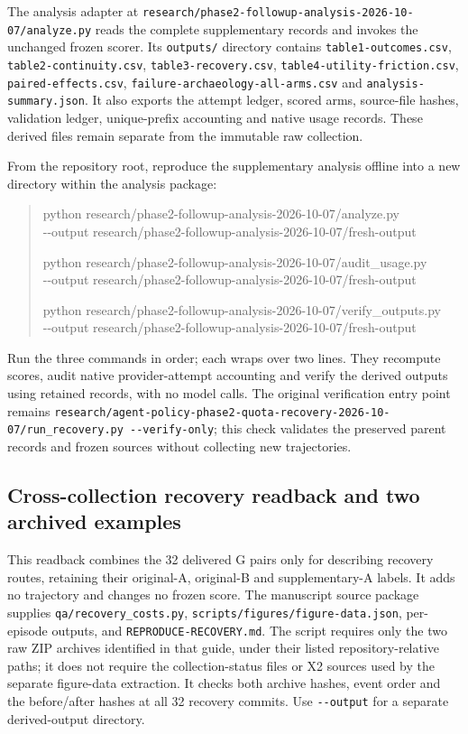 \documentclass[11pt,a4paper]{article}
\newcommand{\code}[1]{\nolinkurl{#1}}
\begin{document}
The analysis adapter at \code{research/phase2-followup-analysis-2026-10-07/analyze.py} reads the complete supplementary records and invokes the unchanged frozen scorer. Its \code{outputs/} directory contains \code{table1-outcomes.csv}, \code{table2-continuity.csv}, \code{table3-recovery.csv}, \code{table4-utility-friction.csv}, \code{paired-effects.csv}, \code{failure-archaeology-all-arms.csv} and \code{analysis-summary.json}. It also exports the attempt ledger, scored arms, source-file hashes, validation ledger, unique-prefix accounting and native usage records. These derived files remain separate from the immutable raw collection.

From the repository root, reproduce the supplementary analysis offline into a new directory within the analysis package:
\begin{quote}\small\ttfamily
python research/phase2-followup-analysis-2026-10-07/analyze.py\\
\hspace*{1em}-{}-output research/phase2-followup-analysis-2026-10-07/fresh-output
\par\medskip
python research/phase2-followup-analysis-2026-10-07/audit\_usage.py\\
\hspace*{1em}-{}-output research/phase2-followup-analysis-2026-10-07/fresh-output
\par\medskip
python research/phase2-followup-analysis-2026-10-07/verify\_outputs.py\\
\hspace*{1em}-{}-output research/phase2-followup-analysis-2026-10-07/fresh-output
\end{quote}
Run the three commands in order; each wraps over two lines. They recompute scores, audit native provider-attempt accounting and verify the derived outputs using retained records, with no model calls. The original verification entry point remains \code{research/agent-policy-phase2-quota-recovery-2026-10-07/run_recovery.py --verify-only}; this check validates the preserved parent records and frozen sources without collecting new trajectories.

\subsection{Cross-collection recovery readback and two archived examples}
\label{app:recovery-readback}
This readback combines the 32 delivered G pairs only for describing recovery routes, retaining their original-A, original-B and supplementary-A labels. It adds no trajectory and changes no frozen score. The manuscript source package supplies \code{qa/recovery_costs.py}, \code{scripts/figures/figure-data.json}, per-episode outputs, and \code{REPRODUCE-RECOVERY.md}. The script requires only the two raw ZIP archives identified in that guide, under their listed repository-relative paths; it does not require the collection-status files or X2 sources used by the separate figure-data extraction. It checks both archive hashes, event order and the before/after hashes at all 32 recovery commits. Use \code{--output} for a separate derived-output directory.
\end{document}
